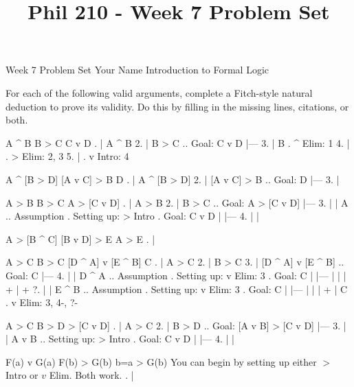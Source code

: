 
\title{Phil 210 - Week 7 Problem Set}

\heading
Week 7 Problem Set
Your Name
Introduction to Formal Logic
\endheading

For each of the following valid arguments, complete a Fitch-style natural deduction to prove its validity. Do this by filling in the missing lines, citations, or both.

\problems
{}
\argument
 A ^ B
 B > C
\argumentline
 C v D
\endargument
	\answer
	. | A ^ B
	 2. | B > C  ..  Goal: C v D
	    |---
	 3. | B      .  ^ Elim: 1
	 4. |        .  > Elim: 2, 3
	 5. |        .  v Intro: 4
	\endfitchproof
	\endanswer

\argument
 A ^ [B > D]
 [A v C] > B
\argumentline
 D
\endargument
	\answer
	. | A ^ [B > D]
	 2. | [A v C] > B  ..  Goal: D
	    |---
	 3. | 
	\endfitchproof
	\endanswer

\argument
 A > B
 B > C
\argumentline
 A > [C v D]
\endargument
	\answer
	. | A > B
	 2. | B > C        ..  Goal: A > [C v D]
	    |---
	 3. |   | A        ..  Assumption  .  Setting up: > Intro  .  Goal: C v D
	    |   |---
	 4. |   | 
	\endfitchproof
	\endanswer

\argument
 A > [B ^ C]
 [B v D] > E
\argumentline
 A > E
\endargument
	\answer
	. | 
	\endfitchproof
	\endanswer

\widerfitchsetup %
\argument
 A > C
 B > C
 [D ^ A] v [E ^ B]
\argumentline
 C
\endargument
	\answer
	. | A > C
	 2. | B > C
	 3. | [D ^ A] v [E ^ B]  ..  Goal: C
	    |---
	 4. |   | D ^ A  ..  Assumption  .  Setting up: v Elim: 3  .  Goal: C
	    |   |---
	    |   | 
	    |   +
	    |   +
	 ?. |   | E ^ B  ..  Assumption  .  Setting up: v Elim: 3  .  Goal: C
	    |   |---
	    |   | 
	    |   +
	    | C          .  v Elim: 3, 4-, ?-
	\endfitchproof
	\endanswer

\argument
 A > C
 B > D
\argumentline
 [A v B] > [C v D]
\endargument
	\answer
	. | A > C
	 2. | B > D          ..  Goal: [A v B] > [C v D]
	    |---
	 3. |   | A v B      ..  Setting up: > Intro    .  Goal: C v D
	    |   |---
	 4. |   | 
	\endfitchproof
	\endanswer

\argument
 F(a) v G(a)
 F(b) > G(b)
\argumentline
 b=a > G(b)
\endargument
\Hint You can begin by setting up either $>$ Intro or $v$ Elim. Both work.
	\answer
	. | 
	\endfitchproof
	\endanswer

